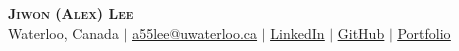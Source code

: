 \begin{center}
    \textbf{\Huge \scshape Jiwon (Alex) Lee} \\ \vspace{1pt}
    {Waterloo, Canada} $|$ 
    \href{mailto:a55lee@uwaterloo.ca}{\underline{a55lee@uwaterloo.ca}} $|$ 
    \href{https://www.linkedin.com/in/alex-jiwon-lee/}{\underline{LinkedIn}} $|$
    \href{https://github.com/1128alex}{\underline{GitHub}} $|$ 
    \href{https://1128alex.github.io/alex-lee/}{\underline{Portfolio}}
\end{center}
